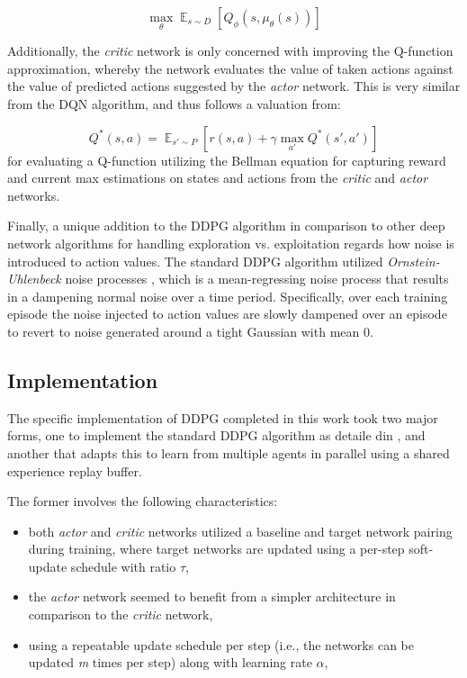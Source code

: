 \documentclass[11pt]{article}
\begin{document}
	\begin{equation}
		\mathop{\mathbb{\text{max}}}_\theta\mathop{\mathbb{E}}_{s\sim D}\left[Q_{\phi}\left(s, \mu_{\theta}(s)\right)\right]
	\end{equation}
	
	Additionally, the \textit{critic} network is only concerned with improving the Q-function approximation, whereby the network evaluates the value of taken actions against the value of predicted actions suggested by the \textit{actor} network. This is very similar from the DQN algorithm, and thus follows a valuation from:
	
	\begin{equation}
		Q^*(s, a) = \mathop{\mathbb{E}}_{s' \sim P}\left[r(s, a) + \gamma\mathop{\mathbb{\text{max}}}_{a'}Q^*(s', a')\right]
	\end{equation}
	for evaluating a Q-function utilizing the Bellman equation for capturing reward and current max estimations on states and actions from the \textit{critic} and \textit{actor} networks.
	
	Finally, a unique addition to the DDPG algorithm in comparison to other deep network algorithms for handling exploration vs. exploitation regards how noise is introduced to action values. The standard DDPG algorithm utilized \textit{Ornstein-Uhlenbeck} noise processes \cite{ddpg}, which is a mean-regressing noise process that results in a dampening normal noise over a time period. Specifically, over each training episode the noise injected to action values are slowly dampened over an episode to revert to noise generated around a tight Gaussian with mean 0.
	
	\subsection{Implementation}
	
	The specific implementation of DDPG completed in this work took two major forms, one to implement the standard DDPG algorithm as detaile din \cite{ddpg}, and another that adapts this to learn from multiple agents in parallel using a shared experience replay buffer.
	
	The former involves the following characteristics:
	\begin{itemize}
		\item both \textit{actor} and \textit{critic} networks utilized a baseline and target network pairing during training, where target networks are updated using a per-step soft-update schedule with ratio $\tau$,
		\item the \textit{actor} network seemed to benefit from a simpler architecture in comparison to the \textit{critic} network,
		\item using a repeatable update schedule per step (i.e., the networks can be updated \textit{m} times per step) along with learning rate $\alpha$,
	\end{itemize}
	
\end{document}
